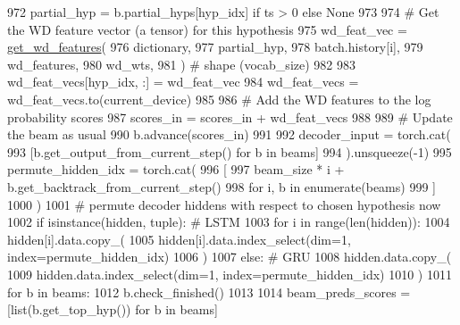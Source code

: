 \begin{DoxyCode}
972                             partial\_hyp = b.partial\_hyps[hyp\_idx] \textcolor{keywordflow}{if} ts > 0 \textcolor{keywordflow}{else} \textcolor{keywordtype}{None}
973 
974                             \textcolor{comment}{# Get the WD feature vector (a tensor) for this hypothesis}
975                             wd\_feat\_vec = \hyperlink{namespaceprojects_1_1controllable__dialogue_1_1controllable__seq2seq_1_1controls_a0324491b8ecb07aaf415e47d6575cbac}{get\_wd\_features}(
976                                 dictionary,
977                                 partial\_hyp,
978                                 batch.history[i],
979                                 wd\_features,
980                                 wd\_wts,
981                             )  \textcolor{comment}{# shape (vocab\_size)}
982 
983                             wd\_feat\_vecs[hyp\_idx, :] = wd\_feat\_vec
984                         wd\_feat\_vecs = wd\_feat\_vecs.to(current\_device)
985 
986                         \textcolor{comment}{# Add the WD features to the log probability scores}
987                         scores\_in = scores\_in + wd\_feat\_vecs
988 
989                     \textcolor{comment}{# Update the beam as usual}
990                     b.advance(scores\_in)
991 
992             decoder\_input = torch.cat(
993                 [b.get\_output\_from\_current\_step() \textcolor{keywordflow}{for} b \textcolor{keywordflow}{in} beams]
994             ).unsqueeze(-1)
995             permute\_hidden\_idx = torch.cat(
996                 [
997                     beam\_size * i + b.get\_backtrack\_from\_current\_step()
998                     \textcolor{keywordflow}{for} i, b \textcolor{keywordflow}{in} enumerate(beams)
999                 ]
1000             )
1001             \textcolor{comment}{# permute decoder hiddens with respect to chosen hypothesis now}
1002             \textcolor{keywordflow}{if} isinstance(hidden, tuple):  \textcolor{comment}{# LSTM}
1003                 \textcolor{keywordflow}{for} i \textcolor{keywordflow}{in} range(len(hidden)):
1004                     hidden[i].data.copy\_(
1005                         hidden[i].data.index\_select(dim=1, index=permute\_hidden\_idx)
1006                     )
1007             \textcolor{keywordflow}{else}:  \textcolor{comment}{# GRU}
1008                 hidden.data.copy\_(
1009                     hidden.data.index\_select(dim=1, index=permute\_hidden\_idx)
1010                 )
1011         \textcolor{keywordflow}{for} b \textcolor{keywordflow}{in} beams:
1012             b.check\_finished()
1013 
1014         beam\_preds\_scores = [list(b.get\_top\_hyp()) \textcolor{keywordflow}{for} b \textcolor{keywordflow}{in} beams]

\end{DoxyCode}
